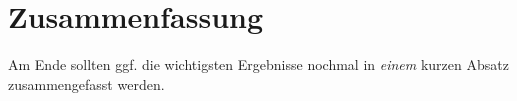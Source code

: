 

\section{Zusammenfassung}
\label{ch:Entwurf:sec:zusammenfassung}

Am Ende sollten ggf. die wichtigsten Ergebnisse nochmal in \emph{einem}
kurzen Absatz zusammengefasst werden.

